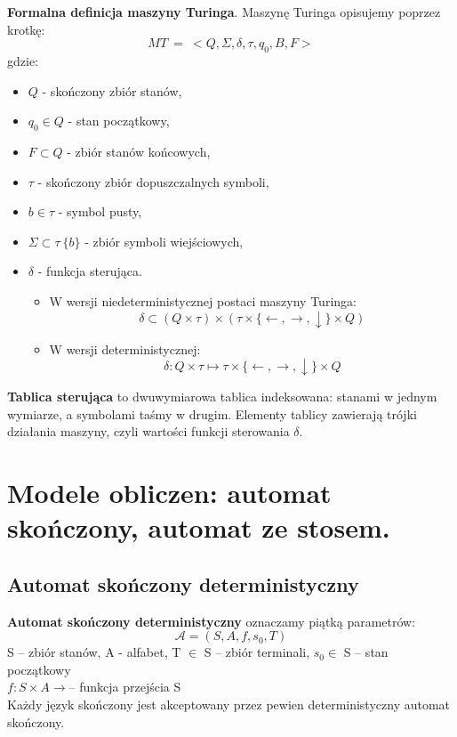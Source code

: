 \documentclass[main.tex]{subfiles}
\begin{document}
    \begin{definition}
        \textbf{Formalna definicja maszyny Turinga}. Maszynę Turinga opisujemy poprzez krotkę:
        \[MT ~ = ~<Q, \Sigma, \delta, \tau, q_0, B, F >\]
        gdzie:
        \begin{itemize}[noitemsep]
            \item $Q$ - skończony zbiór stanów,
            \item $q_0 \in Q$ - stan początkowy,
            \item $F \subset Q$ - zbiór stanów końcowych,
            \item $\tau$  - skończony zbiór dopuszczalnych symboli,
            \item $b \in \tau$  - symbol pusty,
            \item $\Sigma \subset \tau \ \{b\} $ - zbiór symboli wiejściowych,
            \item $\delta$ - funkcja sterująca.
            \begin{itemize}[noitemsep]
                \item W wersji niedeterministycznej postaci maszyny Turinga:
                \[ \delta \subset (Q \times \tau)  \times (\tau \times \{\leftarrow, \rightarrow, \downarrow\}  \times Q)\]
                \item W wersji deterministycznej:
                \[ \delta : Q \times \tau \mapsto \tau \times \{\leftarrow, \rightarrow, \downarrow\} \times Q\]
            \end{itemize}
        \end{itemize}

        \textbf{Tablica sterująca} to dwuwymiarowa tablica indeksowana: stanami w jednym wymiarze, a symbolami taśmy w
        drugim. Elementy tablicy zawierają trójki działania maszyny, czyli wartości funkcji sterowania $\delta$.
    \end{definition}


    \section{Modele obliczen: automat skończony, automat ze stosem.}
    \subsection{Automat skończony deterministyczny}
    \begin{definition}
        \textbf{Automat skończony deterministyczny} oznaczamy piątką parametrów:
        \[\mathcal{A} = (S, A, f, s_{0}, T)\]
        S -- zbiór stanów, A - alfabet, T $\in$ S -- zbiór terminali, $s_{0} \in$ S -- stan początkowy\\
        $f: S\times A \rightarrow$-- funkcja przejścia S \\

        Każdy język skończony jest akceptowany przez pewien deterministyczny automat skończony.
    \end{definition}
\end{document}
